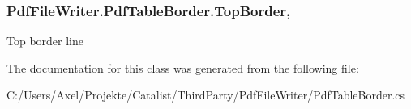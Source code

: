 \subsubsection[{\texorpdfstring{Top\+Border}{TopBorder}}]{ Pdf\+File\+Writer.\+Pdf\+Table\+Border.\+Top\+Border\hspace{0.3cm}{\ttfamily [get]}, {\ttfamily [set]}}\hypertarget{class_pdf_file_writer_1_1_pdf_table_border_a4a2deb0bcdd4fbacccae439ddda6b4f8}{}\label{class_pdf_file_writer_1_1_pdf_table_border_a4a2deb0bcdd4fbacccae439ddda6b4f8}


Top border line 



The documentation for this class was generated from the following file\+:\begin{DoxyCompactItemize}
\item 
C\+:/\+Users/\+Axel/\+Projekte/\+Catalist/\+Third\+Party/\+Pdf\+File\+Writer/Pdf\+Table\+Border.\+cs\end{DoxyCompactItemize}
